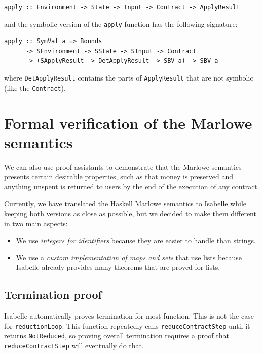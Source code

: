 \documentclass[runningheads]{llncs}
\begin{document}
\begin{verbatim}
apply :: Environment -> State -> Input -> Contract -> ApplyResult
\end{verbatim}

\noindent
and the symbolic version of the \texttt{apply} function has the following signature:

\begin{verbatim}
apply :: SymVal a => Bounds
      -> SEnvironment -> SState -> SInput -> Contract
      -> (SApplyResult -> DetApplyResult -> SBV a) -> SBV a
\end{verbatim}

\noindent
where \texttt{DetApplyResult} contains the parts of \texttt{ApplyResult} that are not symbolic (like the \texttt{Contract}).

\section{Formal verification of the Marlowe semantics\label{sec:verification}}

We can also use proof assistants to demonstrate that the Marlowe semantics presents certain desirable properties, such as that money is preserved and anything unspent is returned to users by the end of the execution of any contract.

Currently, we have translated the Haskell Marlowe semantics to Isabelle while keeping both versions as close as possible, but we decided to make them different in two main aspects:

\begin{itemize}
    \item We use \emph{integers for identifiers} because they are easier to handle than strings.
    \item We use a \emph{custom implementation of maps and sets} that use lists because Isabelle already provides many theorems that are proved for lists.
\end{itemize}

\subsection{Termination proof}

Isabelle automatically proves termination for most function. This is not the case for \texttt{reductionLoop}. This function repeatedly calls \texttt{reduceContractStep} until it returns \texttt{NotReduced}, so proving overall termination requires a proof that \texttt{reduceContractStep} will eventually do that.
\end{document}
